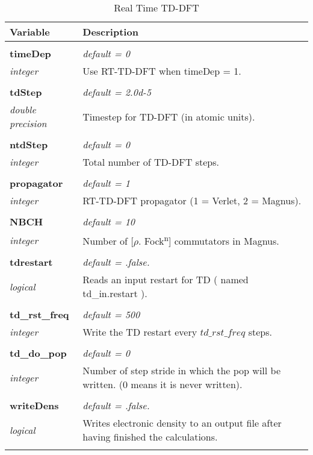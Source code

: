 \begin{Spacing}{1.0}
\begin{longtable}{ p{} p{} }

   \toprule
   \textbf{Variable} & Description \\*
   \midrule \\*
   \endhead

   \bottomrule
   \caption{Real Time TD-DFT}
   \endfoot

   \textbf{timeDep}
   &  \textit{default = 0}
   \\*\textit{integer}
   & Use RT-TD-DFT when timeDep = 1.\\* \\

   \textbf{tdStep}
   &  \textit{default = 2.0d-5}
   \\*\textit{double precision}
   & Timestep for TD-DFT (in atomic units).\\* \\

   \textbf{ntdStep}
   &  \textit{default = 0}
   \\*\textit{integer}
   & Total number of TD-DFT steps.\\* \\

   \textbf{propagator}
   &  \textit{default = 1}
   \\*\textit{integer}
   & RT-TD-DFT propagator (1 = Verlet, 2 = Magnus).\\* \\

   \textbf{NBCH}
   &  \textit{default = 10}
   \\*\textit{integer}
   & Number of [$\rho$. Fock\textsuperscript{n}] commutators
   in Magnus.\\* \\

   \textbf{tdrestart}
   &  \textit{default = .false. }
   \\*\textit{logical}
   & Reads an input restart for TD ( named td\_in.restart ).\\* \\

   \textbf{td\_rst\_freq}
   &  \textit{default = 500}
   \\*\textit{integer}
   & Write the TD restart every $td\_rst\_freq$ steps.\\* \\

   \textbf{td\_do\_pop}
   &  \textit{default = 0}
   \\*\textit{integer}
   & Number of step stride in which the pop will be written.
   (0 means it is never written).\\* \\

   \textbf{writeDens}
   &  \textit{default = .false. }
   \\*\textit{logical}
   & Writes electronic density to an output file after
   having finished the calculations.\\* \\

\end{longtable}
\end{Spacing}
